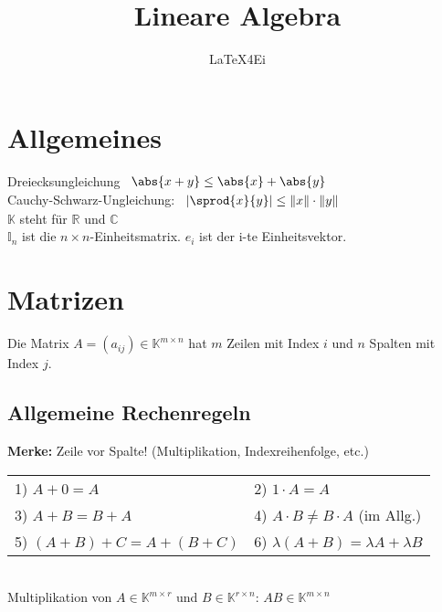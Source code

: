 \documentclass[german, 6pt]{latex4ei/latex4ei_sheet}
\title{Lineare Algebra}
\author{LaTeX4Ei}
\begin{document}
\maketitle
\section{Allgemeines} %
\label{sub:allgemeines}

Dreiecksungleichung \qquad \qquad \qquad
\begin{math}\begin{array}{l}
	\abs{x + y} \le \abs{x} + \abs{y}
\end{array}\end{math} \\
Cauchy-Schwarz-Ungleichung: \qquad 
\begin{math}\begin{array}{l}
\left| \sprod{x}{y} \right| \le \| x\| \cdot \| y\|
\end{array}\end{math}\\
$\mathbb{K}$ steht für $\mathbb{R}$ und $\mathbb{C}$\\
$\mathbb{I}_n$ ist die $n\times n$-Einheitsmatrix. \qquad$e_i$ ist der i-te Einheitsvektor.
\section{Matrizen}
Die Matrix $A=(a_{ij}) \in \mathbb K^{m\times n}$ hat $m$ Zeilen mit Index $i$ und $n$ Spalten mit Index $j$.

\subsection{Allgemeine Rechenregeln}
\textbf{Merke:} Zeile vor Spalte! (Multiplikation, Indexreihenfolge, etc.)
\begin{tabular}{ll}	
	1)  $A+0=A$ & 2)  $1 \cdot A=A$ \\
	3)  $A+B=B+A$ & 4) $A \cdot B \ne B \cdot A$ (im Allg.) \\
	5)  $(A+B)+C=A+(B+C)$ & 6) $\lambda (A+B) = \lambda A + \lambda B$\\ 
\end{tabular}\\
Multiplikation von $A\in \mathbb K^{m\times r}$ und $B\in \mathbb K^{r\times n}$: $AB\in\mathbb K^{m\times n}$
\end{document}
